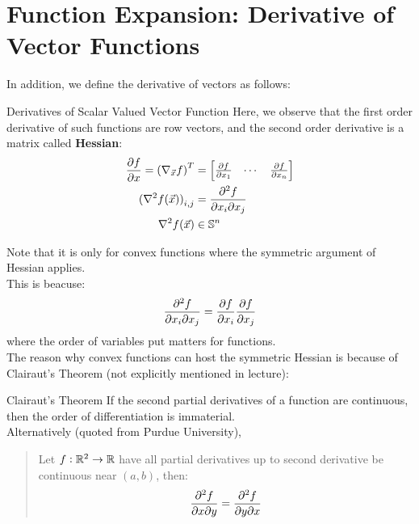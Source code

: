 \section{Function Expansion: Derivative of Vector Functions}
In addition, we define the derivative of vectors as follows:
\begin{ln-define}{Derivatives of Scalar Valued Vector Function}{}
    Here, we observe that the first order derivative of such functions are row vectors, and the second order derivative is a matrix called \textbf{Hessian}:
    \begin{align*}
        \pdv{f}{x} = {(\nabla_{\vec{x}}f)}^T &= \begin{bmatrix} \pdv{f}{x_1} & \cdots & \pdv{f}{x_n} \end{bmatrix} \\
        {(\nabla^2 f(\vec{x}))}_{i,j} &= \pdv{f}{x_i}{x_j} \\
        \nabla^2 f(\vec{x}) &\in \mathbb{S}^n
    \end{align*}
\end{ln-define}
Note that it is only for convex functions where the symmetric argument of Hessian applies. \\
This is beacuse:
\[
    \pdv{f}{x_i}{x_j} = \pdv{f}{x_i} \pdv{f}{x_j}
\]
where the order of variables put matters for functions. \\
The reason why convex functions can host the symmetric Hessian is because of Clairaut's Theorem (not explicitly mentioned in lecture):
\begin{ln-theorem}{Clairaut's Theorem}{}
    If the second partial derivatives of a function are continuous, then the order of differentiation is immaterial. \\
    Alternatively (quoted from Purdue University),
    \begin{quote}
        Let $f : \mathbb{R}^2 \rightarrow \mathbb{R}$ have all partial derivatives up to second derivative be continuous near $(a, b)$, then:
        \[
            \pdv{f}{x}{y} (a, b) = \pdv{f}{y}{x} (a, b)
        \]
    \end{quote}
\end{ln-theorem}

